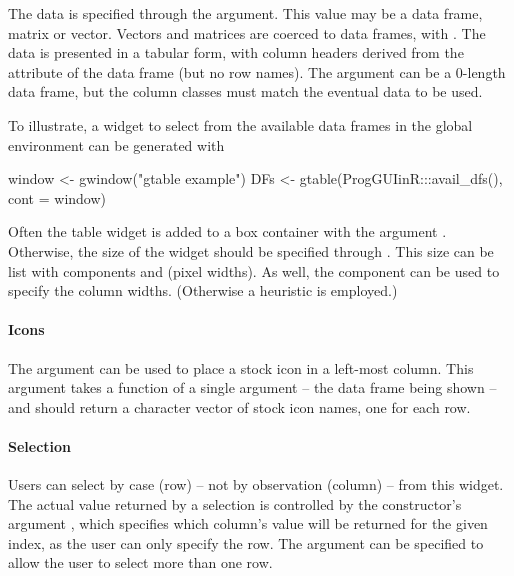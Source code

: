 
The data is specified through the 
argument. This value may be a data frame, matrix or vector. Vectors and
matrices are coerced to data frames, with
.  The data is presented in a tabular
form, with column headers derived from the  attribute of
the data frame (but no row names). The 
argument can be a $0$-length data frame, but the column classes must
match the eventual data to be used.


To illustrate, a widget to select from the available data frames in
the global environment can be generated with
\begin{Schunk}
\begin{Sinput}
 window <- gwindow("gtable example")
 DFs <- gtable(ProgGUIinR:::avail_dfs(), cont = window)
\end{Sinput}
\end{Schunk}

Often the table widget is added to a box container with the argument
. Otherwise, the size of the widget should be specified
through . This size can be list with components 
and  (pixel widths). As well, the component
 can be used to specify the column
widths. (Otherwise a heuristic is employed.)

\paragraph{Icons}
The  argument can be used to place a stock
icon in a left-most column.  This argument takes a function of a
single argument -- the data frame being shown -- and should return a
character vector of stock icon names, one for each row.

\paragraph{Selection}
Users can select by case (row) -- not by observation (column) -- from
this widget. The actual value returned by a selection is controlled by
the constructor's argument , which
specifies which column's value will be returned for the given index,
as the user can only specify the row. The 
argument can be specified to allow the user to select more than one
row.

